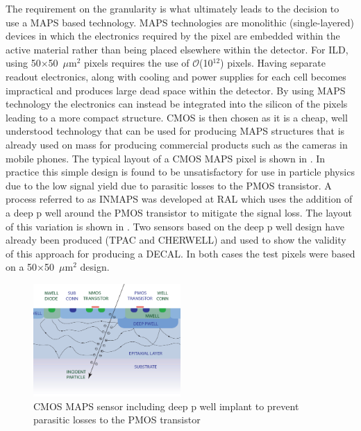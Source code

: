 The requirement on the granularity is what ultimately leads to the decision to use a \ac{MAPS} based technology. \ac{MAPS} technologies are monolithic (single-layered) devices in which the electronics required by the pixel are embedded within the active material rather than being placed elsewhere within the detector. For \ac{ILD}, using 50$\times$50~$\mu$m$^2$ pixels requires the use of $\mathcal{O}$(10$^{12}$) pixels. Having separate readout electronics, along with cooling and power supplies for each cell becomes impractical and produces large dead space within the detector. By using \ac{MAPS} technology the electronics can instead be integrated into the silicon of the pixels leading to a more compact structure. \ac{CMOS} is then chosen as it is a cheap, well understood technology that can be used for producing \ac{MAPS} structures that is already used on mass for producing commercial products such as the cameras in mobile phones. The typical layout of a \ac{CMOS} \ac{MAPS} pixel is shown in . In practice this simple design is found to be unsatisfactory for use in particle physics due to the low signal yield due to parasitic losses to the PMOS transistor. A process referred to as INMAPS was developed at \ac{RAL}\cite{2008arXiv0807.2920B} which uses the addition of a deep p well around the PMOS transistor to mitigate the signal loss. The layout of this variation is shown in . Two sensors based on the deep p well design have already been produced (TPAC\cite{Ballin:2008rha} and CHERWELL\cite{MYLROIESMITH2013137}) and used to show the validity of this approach for producing a \ac{DECAL}\cite{Price:2013js}. In both cases the test pixels were based on a 50$\times$50~$\mu$m$^2$ design.


\begin{figure}
  \centering
  \includegraphics[width=0.5\textwidth,keepaspectratio]{DECALStudies/fig/deeppwell}
  \caption{\ac{CMOS} \ac{MAPS} sensor including deep p well implant to prevent parasitic losses to the PMOS transistor\cite{MYLROIESMITH2013137}}
  \label{fig:deeppwell}
\end{figure}

